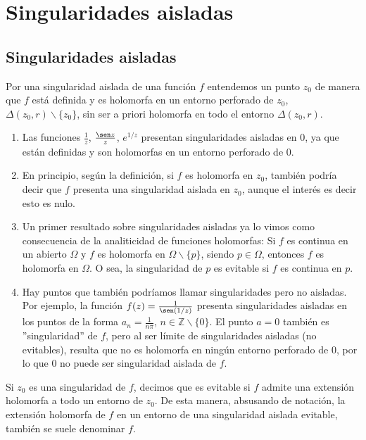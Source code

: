 \chapter{Singularidades aisladas}

\section{Singularidades aisladas}

\begin{defi}
    Por una singularidad aislada de una función $f$ entendemos un punto $z_0$ de manera que $f$ está definida y es holomorfa en un entorno perforado de $z_0$, $\Delta(z_0,r) \backslash \{z_0\}$, sin ser a priori holomorfa en todo el entorno $\Delta(z_0,r)$.
\end{defi}

\begin{ejemplo}
    \begin{enumerate}
        \item Las funciones $\frac{1}{z}$, $\frac{\sen z}{z}$, $e^{1/z}$ presentan singularidades aisladas en 0, ya que están definidas y son holomorfas en un entorno perforado de 0.
        \item En principio, según la definición, si $f$ es holomorfa en $z_0$, también podría decir que $f$ presenta una singularidad aislada en $z_0$, aunque el interés es decir esto es nulo.
        \item Un primer resultado sobre singularidades aisladas ya lo vimos como consecuencia de la analiticidad de funciones holomorfas: Si $f$ es continua en un abierto $\Omega$ y $f$ es holomorfa en $\Omega \backslash \{p\}$, siendo $p \in \Omega$, entonces $f$ es holomorfa en $\Omega$. O sea, la singularidad de $p$ es evitable si $f$ es continua en $p$.
        \item Hay puntos que también podríamos llamar singularidades pero no aisladas. Por ejemplo, la función $f(z) = \frac{1}{\sen (1/z)}$ presenta singularidades aisladas en los puntos de la forma $a_n = \frac{1}{n\pi}$, $n \in \mathbb{Z} \backslash \{0\}$. El punto $a = 0$ también es ''singularidad'' de $f$, pero al ser límite de singularidades aisladas (no evitables), resulta que no es holomorfa en ningún entorno perforado de 0, por lo que 0 no puede ser singularidad aislada de $f$.
    \end{enumerate}
\end{ejemplo}

\begin{defi}
    Si $z_0$ es una singularidad de $f$, decimos que es evitable si $f$ admite una extensión holomorfa a todo un entorno de $z_0$. De esta manera, absusando de notación, la extensión holomorfa de $f$ en un entorno de una singularidad aislada evitable, también se suele denominar $f$.
\end{defi}

